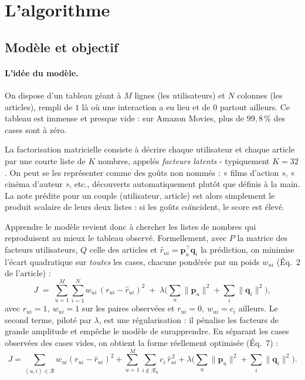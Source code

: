 \documentclass[11pt,a4paper]{article}
\begin{document}
\section{L'algorithme}\label{sec:algo}

\subsection{Modèle et objectif}

\paragraph{L'idée du modèle.} On dispose d'un tableau géant à $M$ lignes
(les utilisateurs) et $N$ colonnes (les articles), rempli de $1$ là où une interaction a
eu lieu et de $0$ partout ailleurs. Ce tableau est immense et presque vide : sur Amazon
Movies, plus de $99{,}8$\,\% des cases sont à zéro.

La factorisation matricielle consiste à décrire chaque utilisateur et chaque article par
une courte liste de $K$ nombres, appelés \emph{facteurs latents} - typiquement $K=32$.
On peut se les représenter comme des goûts non nommés : « films d'action », « cinéma
d'auteur », etc., découverts automatiquement plutôt que définis à la main. La note
prédite pour un couple (utilisateur, article) est alors simplement le produit scalaire
de leurs deux listes : si les goûts coïncident, le score est élevé.

Apprendre le modèle revient donc à chercher les listes de nombres qui reproduisent au
mieux le tableau observé. Formellement, avec $P$ la matrice des facteurs utilisateurs,
$Q$ celle des articles et $\hat r_{ui}=\mathbf{p}_u^{\top}\mathbf{q}_i$ la prédiction,
on minimise l'écart quadratique sur \emph{toutes} les cases, chacune pondérée par un
poids $w_{ui}$ (Éq.~2 de l'article) :
\begin{equation}\label{eq:obj}
J \;=\; \sum_{u=1}^{M}\sum_{i=1}^{N} w_{ui}\,(r_{ui}-\hat r_{ui})^2
\;+\;\lambda\Big(\textstyle\sum_u \|\mathbf p_u\|^2+\sum_i\|\mathbf q_i\|^2\Big),
\end{equation}
avec $r_{ui}=1,\ w_{ui}=1$ sur les paires observées et $r_{ui}=0,\ w_{ui}=c_i$ ailleurs.
Le second terme, piloté par $\lambda$, est une régularisation : il pénalise les
facteurs de grande amplitude et empêche le modèle de surapprendre. En séparant les
cases observées des cases vides, on obtient la forme réellement optimisée (Éq.~7) :
\begin{equation}\label{eq:obj7}
J=\sum_{(u,i)\in\mathcal{R}} w_{ui}(r_{ui}-\hat r_{ui})^2
+\sum_{u=1}^{M}\sum_{i\notin\mathcal{R}_u} c_i\,\hat r_{ui}^{\,2}
+\lambda\Big(\textstyle\sum_u\|\mathbf p_u\|^2+\sum_i\|\mathbf q_i\|^2\Big).
\end{equation}
\end{document}
